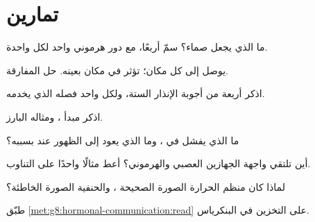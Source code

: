 \section{تمارين}

\begin{exercise}[$\star$]\label{exo:g8:hormonal-communication:1}
ما الذي يجعل  صماء؟ سمّ أربعًا، مع دور هرموني واحد
لكل واحدة.
\end{exercise}

\begin{exercise}[$\star$]\label{exo:g8:hormonal-communication:2}
 يوصل إلى كل مكان؛  تؤثر في مكان بعينه.
حل المفارقة.
\end{exercise}

\begin{exercise}[$\star$]\label{exo:g8:hormonal-communication:3}
اذكر أربعة من أجوبة  الإنذار الستة، ولكل واحد فصله
الذي يخدمه.
\end{exercise}

\begin{exercise}[$\star$]\label{exo:g8:hormonal-communication:4}
اذكر مبدأ ، ومثاله البارز.
\end{exercise}

\begin{exercise}[$\star$]\label{exo:g8:hormonal-communication:5}
ما الذي يفشل في ، وما الذي يعود إلى الظهور عند
 بسببه؟
\end{exercise}

\begin{exercise}[$\star$]\label{exo:g8:hormonal-communication:6}
أين تلتقي واجهة الجهازين العصبي والهرموني؟ أعط مثالًا
واحدًا على التناوب.
\end{exercise}

\begin{exercise}[$\star\star$]\label{exo:g8:hormonal-communication:7}
لماذا كان منظم الحرارة الصورة الصحيحة ،
والحنفية الصورة الخاطئة؟
\end{exercise}

\begin{exercise}[$\star\star$]\label{exo:g8:hormonal-communication:8}
طبّق \cref{met:g8:hormonal-communication:read} على 
التخزين في البنكرياس.
\end{exercise}

